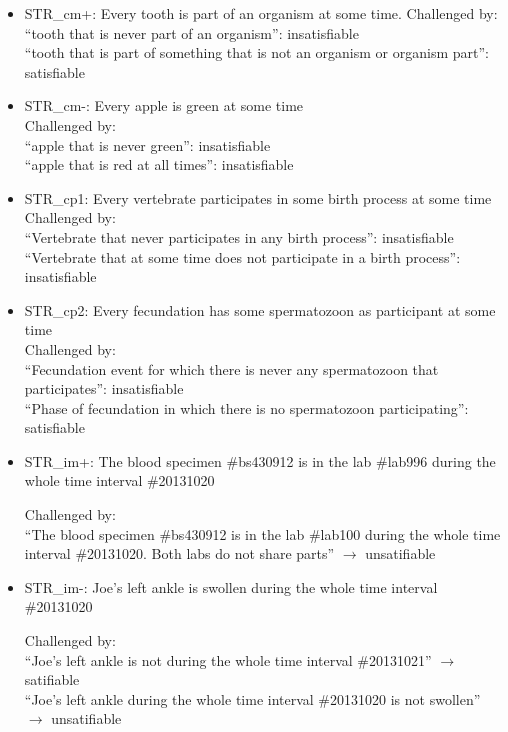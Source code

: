 \begin{itemize}
\item STR\_cm+: Every tooth is part of an organism at some time. Challenged by: \\ ``tooth that is never part of an organism'': insatisfiable \\
``tooth that is part of something that is not an organism or organism part'': satisfiable 


\item STR\_cm-: Every apple is green at some time
\\
Challenged by: \\ ``apple that is never green'': insatisfiable \\
``apple that is red at all times'': insatisfiable 


\item STR\_cp1: Every vertebrate participates in some birth process at some time\\
Challenged by: \\ ``Vertebrate that never participates in any birth process'': insatisfiable \\
``Vertebrate that at some time does not participate in a birth process'': insatisfiable 



\item STR\_cp2: Every fecundation has some spermatozoon as participant at some time
\\
Challenged by: \\ ``Fecundation event for which there is never any spermatozoon that participates'': insatisfiable \\
``Phase of fecundation in which there is no spermatozoon participating'': satisfiable 




\item STR\_im+: The blood specimen \#bs430912 is in the lab \#lab996 during the whole time interval \#20131020

Challenged by: \\ ``The blood specimen \#bs430912 is in the lab \#lab100 during the whole time interval \#20131020. Both labs do not share parts'' $\rightarrow$ unsatifiable



\item STR\_im-: Joe's left ankle is swollen during the whole time interval \#20131020

Challenged by: \\ ``Joe's left ankle is not during the whole time interval \#20131021'' $\rightarrow$ satifiable
\\ 
``Joe's left ankle during the whole time interval \#20131020 is not swollen'' $\rightarrow$ unsatifiable




\end{itemize}
